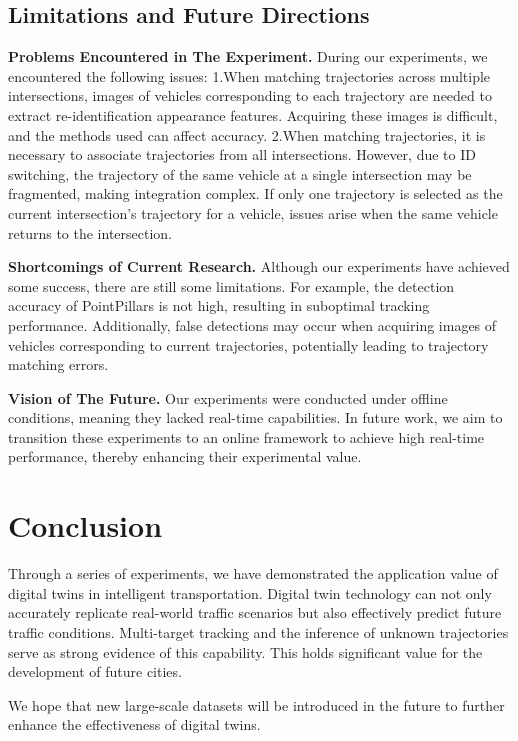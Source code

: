 \documentclass[lettersize,journal]{IEEEtran}
\begin{document}
\subsection{Limitations and Future Directions}

\textbf{Problems Encountered in The Experiment.}
During our experiments, we encountered the following issues:  
1.When matching trajectories across multiple intersections, images of vehicles corresponding to each trajectory are needed to extract re-identification appearance features. 
Acquiring these images is difficult, and the methods used can affect accuracy.  
2.When matching trajectories, it is necessary to associate trajectories from all intersections. 
However, due to ID switching, the trajectory of the same vehicle at a single intersection may be fragmented, making integration complex. 
If only one trajectory is selected as the current intersection's trajectory for a vehicle, issues arise when the same vehicle returns to the intersection.

\textbf{Shortcomings of Current Research.}
Although our experiments have achieved some success, there are still some limitations. 
For example, the detection accuracy of PointPillars is not high, resulting in suboptimal tracking performance. 
Additionally, false detections may occur when acquiring images of vehicles corresponding to current trajectories, potentially leading to trajectory matching errors.

\textbf{Vision of The Future.}
Our experiments were conducted under offline conditions, meaning they lacked real-time capabilities. 
In future work, we aim to transition these experiments to an online framework to achieve high real-time performance, thereby enhancing their experimental value.


\section{Conclusion}

Through a series of experiments, we have demonstrated the application value of digital twins in intelligent transportation. 
Digital twin technology can not only accurately replicate real-world traffic scenarios but also effectively predict future traffic conditions. 
Multi-target tracking and the inference of unknown trajectories serve as strong evidence of this capability. 
This holds significant value for the development of future cities.

We hope that new large-scale datasets will be introduced in the future to further enhance the effectiveness of digital twins.




\end{document}
